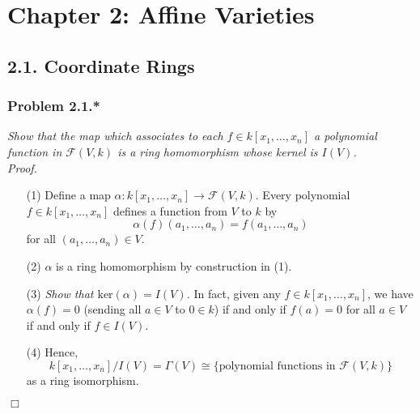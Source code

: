 \documentclass{article}
\begin{document}



\newpage
\section*{Chapter 2: Affine Varieties \\}



\subsection*{2.1. Coordinate Rings \\}



\subsubsection*{Problem 2.1.*}
\emph{Show that the map which associates to each
$f \in k[x_1,\ldots,x_n]$ a polynomial function in $\mathscr{F}(V,k)$
is a ring homomorphism whose kernel is $I(V)$.} \\

\emph{Proof.}
\begin{enumerate}
\item[(1)]
  Define a map $\alpha: k[x_1,\ldots,x_n] \to \mathscr{F}(V,k)$.
  Every polynomial $f \in k[x_1,\ldots,x_n]$ defines a function
  from $V$ to $k$ by
  \[
    \alpha(f)(a_1,\ldots,a_n) = f(a_1,\ldots,a_n)
  \]
  for all $(a_1,\ldots,a_n) \in V$.

\item[(2)]
  $\alpha$ is a ring homomorphism by construction in (1).

\item[(3)]
  \emph{Show that $\mathrm{ker}(\alpha) = I(V)$.}
  In fact,
  given any $f \in k[x_1,\ldots,x_n]$, we have
  $\alpha(f) = 0$ (sending all $a \in V$ to $0 \in k$)
  if and only if $f(a) = 0$ for all $a \in V$
  if and only if $f \in I(V)$.

\item[(4)]
  Hence,
  \[
    k[x_1,\ldots,x_n]/I(V) = \Gamma(V)
    \cong
    \{ \text{polynomial functions in $\mathscr{F}(V,k)$} \}
  \]
  as a ring isomorphism.
\end{enumerate}
$\Box$ \\\\
\end{document}
